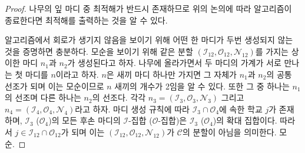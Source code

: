 \documentclass[11pt]{article} %
\newif\ifen
\theoremstyle{definition}
\theoremstyle{definition}
\begin{document}
\begin{proof}
\ifen
Because an optimal solution exists among the leaves of the tree, the discussion above implies that as long as the algorithm terminates, it returns an optimal solution.

To show that the algorithm does not cycle, it suffices to show that no node is generated twice. Suppose not: that two distinct nodes $n_1$ and $n_2$ share the same partition $(\mathcal{I}_{12}, \mathcal{O}_{12}, \mathcal{N}_{12})$. Trace each node's lineage up the tree and let $n$ denote the \emph{first} node at which the lineages meet. $n$ must have two children, or else its sole child is a common ancestor of $n_1$ and $n_2$, and one of these children, say $n_3$, must be an ancestor of $n_1$ while the other, say $n_4$, is an ancestor of $n_2$.  Write $n_3 = (\mathcal{I}_{3}, \mathcal{O}_{3}, \mathcal{N}_{3})$ and $n_4 = (\mathcal{I}_{4}, \mathcal{O}_{4}, \mathcal{N}_{4})$. By the node-generation rule, there is a school $j$ in $\mathcal{I}_3 \cap \mathcal{O}_4$, and the $\mathcal{I}$-set (respectively, $\mathcal{O}$-set) for any descendant of $\mathcal{I}_3$ (respectively, $\mathcal{O}_4$) is a superset of  $\mathcal{I}_3$ (respectively, $\mathcal{O}_4$). Therefore, $j \in \mathcal{I}_{12} \cap \mathcal{O}_{12}$, meaning that $(\mathcal{I}_{12}, \mathcal{O}_{12}, \mathcal{N}_{12})$ is not a partition of $\mathcal{C}$, a contradiction. 
\else
나무의 잎 마디 중 최적해가 반드시 존재하므로 위의 논의에 따라 알고리즘이 종료한다면 최적해를 출력하는 것을 알 수 있다.

알고리즘에서 회로가 생기지 않음을 보이기 위해 어떤 한 마디가 두번 생성되지 않는 것을 증명하면 충분하다. 모순을 보이기 위해 같은 분할 $(\mathcal{I}_{12}, \mathcal{O}_{12}, \mathcal{N}_{12})$를 가지는 상이한 마디 $n_1$과 $n_2$가 생성된다고 하자. 나무에 올라가면서 두 마디의 가계가 서로 만나는 첫 마디를 $n$이라고 하자. $n$은 새끼 마디 하나만 가지면 그 자체가  $n_1$과 $n_2$의 공통 선조가 되며 이는 모순이므로 $n$ 새끼의 개수가 2임을 알 수 있다. 또한 그 중 하나는 $n_1$의 선조며 다른 하나는 $n_2$의 선조다. 각각 $n_3 = (\mathcal{I}_{3}, \mathcal{O}_{3}, \mathcal{N}_{3})$ 그리고 $n_4 = (\mathcal{I}_{4}, \mathcal{O}_{4}, \mathcal{N}_{4})$라고 하자. 마디 생성 규칙에 따라 $\mathcal{I}_3 \cap \mathcal{O}_4$에 속한 학교 $j$가 존재하며,  $\mathcal{I}_3$ ($\mathcal{O}_4$)의 모든 후손 마디의 $\mathcal{I}$-집합 ($\mathcal{O}$-집합)은  $\mathcal{I}_3$ ($\mathcal{O}_4$)의 확대 집합이다. 따라서 $j \in \mathcal{I}_{12} \cap \mathcal{O}_{12}$가 되며 이는 $(\mathcal{I}_{12}, \mathcal{O}_{12}, \mathcal{N}_{12})$가 $\mathcal{C}$의 분할이 아님을 의미한다. 모순. 
\fi
\end{proof}
\end{document}
